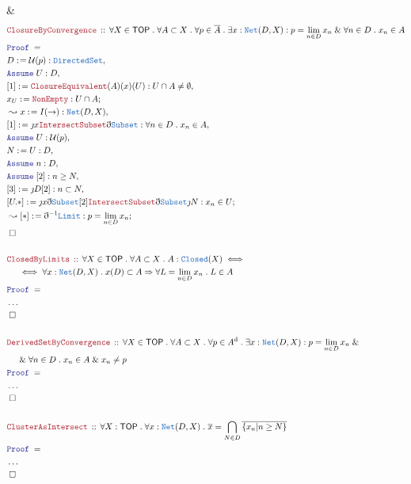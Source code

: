 \documentclass[12pt]{scrartcl}
\newcommand{\TYPE}[1]{\textcolor{NavyBlue}{\mathtt{#1}}}
\newcommand{\LOGIC}[1]{\textcolor{Blue}{\mathtt{#1}}}
\newcommand{\THM}[1]{\textcolor{Maroon}{\mathtt{#1}}}
\renewcommand{\.}{\; . \;}
\newcommand{\de}{: \kern 0.1pc =}
\newcommand{\Theorem}[2]{& \THM{#1} \, :: \, #2 \\ & \Proof = \\ }
\newcommand{\NewLine}{\\ & \kern 1pc}
\newcommand{\Page}[1]{ \begin{align*} #1 \end{align*}   }
\newcommand{ \bd }{ \ByDef }
\newcommand{\NoProof}{ & \ldots \\ \EndProof}
\renewcommand{\And}{\; \& \;}
\newcommand{\Imply}{\Rightarrow}
\newcommand{\Say}[3]{& #1 \de #2 : #3, \\}
\newcommand{\Conclude}[3]{& #1 \de #2 : #3; \\}
\newcommand{\Derive}[3]{& \leadsto #1 \de #2 : #3, \\}
\newcommand{\DeriveConclude}[3]{& \leadsto #1 \de #2 : #3 ; \\}
\newcommand{\Assume}[2]{& \LOGIC{Assume} \; #1 : #2, \\}
\newcommand{\QED}{\; \square}
\newcommand{\EndProof}{& \QED \\}
\newcommand{\ByDef}{\eth}
\newcommand{\ByConstr}{\jmath}
\newcommand{\Proof}{\LOGIC{Proof} \; }
\newcommand{\TOP}{\mathsf{TOP}}
\newcommand{\U}{\mathcal{U}}
\renewcommand{\d}{\mathrm{d}}
\begin{document}
{{	}
	\EndProof
}\Page{
	\Theorem{ClosureByConvergence}
	{
		\forall X \in \TOP \.
		\forall A \subset X \.
		\forall p \in \overline{A} \.
		\exists x : \TYPE{Net}(D,X) :
		p = \lim_{n \in D} x_n \And \forall n \in D \. x_n \in A
	}
	\Say{D}{\U(p)}{\TYPE{DirectedSet}}
	\Assume{U}{D}
	\Say{[1]}{\THM{ClosureEquivalent}(A)(x)(U)}{ U \cap A \neq \emptyset}
	\Conclude{x_U}{\THM{NonEmpty}}{ U \cap A  }
	\Derive{x}{I(\to)}{\TYPE{Net}(D,X)}
	\Say{[1]}{\ByConstr x \THM{IntersectSubset} \bd \TYPE{Subset}}{ \forall n \in D \. x_n \in A  }
	\Assume{U}{\U(p)}
	\Say{N}{U}{D}
	\Assume{n}{D}
	\Assume{[2]}{n \ge N}
	\Say{[3]}{\ByConstr D[2]}{n \subset N}
	\Conclude{[U.*]}{\ByConstr x \bd \TYPE{Subset} [2] \THM{IntersectSubset} \bd \TYPE{Subset}\ByConstr N}
	{
		x_n \in U                                 
	}
	\DeriveConclude{[*]}{\bd^{-1} \TYPE{Limit}}{p = \lim_{n \in D} x_n }
	\EndProof
	\\
	\Theorem{ClosedByLimits}
	{
		\forall X \in \TOP \.
		\forall A \subset X \.
		A : \TYPE{Closed}(X) 
		\iff \NewLine \iff
		\forall x : \TYPE{Net}(D,X) \. x(D) \subset A \Imply  \forall L = \lim_{n \in D} x_n \. L \in A
	}
	\NoProof
	\\
	\Theorem{DerivedSetByConvergence}
	{
		\forall X \in \TOP \.
		\forall A \subset X \.
		\forall p \in A^\d \.
		\exists x : \TYPE{Net}(D,X) :
		p = \lim_{n \in D} x_n \And 
		\NewLine \And
		\forall n \in D \. x_n \in A \And x_n \neq p
	}
	\NoProof
	\\
	\Theorem{ClusterAsIntersect}
	{
		\forall X : \TOP \.
		\forall x : \TYPE{Net}(D,X) \. 
		\overline{x} = \bigcap_{N \in D} \overline{\{ x_n | n \ge N \}}
	}
	\NoProof
}
\newpage
\end{document}
